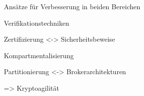 \begin{frame}[c]{Ansätze für Verbesserung in beiden Bereichen}

  Verifikationstechniken
  \vspace{0.5em}

  {\footnotesize Zertifizierung <-> Sicherheitsbeweise}
  \vspace{1.5em}

  Kompartmentalisierung
  \vspace{0.5em}

  {\footnotesize Partitionierung <-> Brokerarchitekturen}
  \vspace{1.5em}


  => Kryptoagilität
\end{frame}
